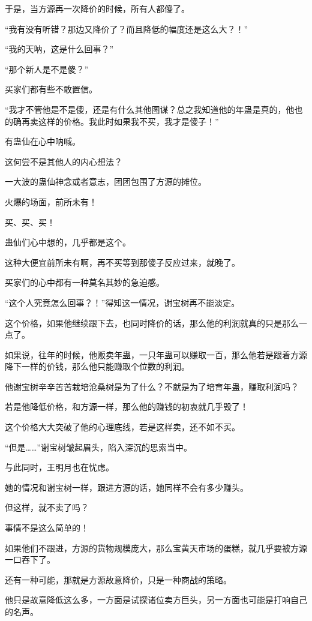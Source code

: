 \begin{this_body}
于是，当方源再一次降价的时候，所有人都傻了。

“我有没有听错？那边又降价了？而且降低的幅度还是这么大？！”

“我的天呐，这是什么回事？”

“那个新人是不是傻？”

买家们都有些不敢置信。

“我才不管他是不是傻，还是有什么其他图谋？总之我知道他的年蛊是真的，他也的确再卖这样的价格。我此时如果我不买，我才是傻子！”

有蛊仙在心中呐喊。

这何尝不是其他人的内心想法？

一大波的蛊仙神念或者意志，团团包围了方源的摊位。

火爆的场面，前所未有！

买、买、买！

蛊仙们心中想的，几乎都是这个。

这种大便宜前所未有啊，再不买等到那傻子反应过来，就晚了。

买家们的心中都有一种莫名其妙的急迫感。

“这个人究竟怎么回事？！”得知这一情况，谢宝树再不能淡定。

这个价格，如果他继续跟下去，也同时降价的话，那么他的利润就真的只是那么一点了。

如果说，往年的时候，他贩卖年蛊，一只年蛊可以赚取一百，那么他若是跟着方源降下一样的价钱，那么他只能赚取个位数的利润。

他谢宝树辛辛苦苦栽培沧桑树是为了什么？不就是为了培育年蛊，赚取利润吗？

若是他降低价格，和方源一样，那么他的赚钱的初衷就几乎毁了！

这个价格大大突破了他的心理底线，若是这样卖，还不如不买。

“但是……”谢宝树皱起眉头，陷入深沉的思索当中。

与此同时，王明月也在忧虑。

她的情况和谢宝树一样，跟进方源的话，她同样不会有多少赚头。

但这样，就不卖了吗？

事情不是这么简单的！

如果他们不跟进，方源的货物规模庞大，那么宝黄天市场的蛋糕，就几乎要被方源一口吞下了。

还有一种可能，那就是方源故意降价，只是一种商战的策略。

他只是故意降低这么多，一方面是试探诸位卖方巨头，另一方面也可能是打响自己的名声。


\end{this_body}
